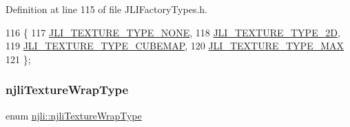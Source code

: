 Definition at line 115 of file J\+L\+I\+Factory\+Types.\+h.


\begin{DoxyCode}
116   \{
117     \mbox{\hyperlink{namespacenjli_a90fea397e2267cd1b01c163319db48fbab5e739e2d62a00c06335ad4eb96bd7d7}{JLI\_TEXTURE\_TYPE\_NONE}},
118     \mbox{\hyperlink{namespacenjli_a90fea397e2267cd1b01c163319db48fba1fc3a248edc8a6093efb9ed946de3915}{JLI\_TEXTURE\_TYPE\_2D}},
119     \mbox{\hyperlink{namespacenjli_a90fea397e2267cd1b01c163319db48fba244d1d6419307868899f3607854a6a00}{JLI\_TEXTURE\_TYPE\_CUBEMAP}},
120     \mbox{\hyperlink{namespacenjli_a90fea397e2267cd1b01c163319db48fbacab660ca2ecd47a3ad29fb4b2285aa7e}{JLI\_TEXTURE\_TYPE\_MAX}}
121   \};
\end{DoxyCode}
\mbox{\label{namespacenjli_a6e9496d4850ec7151f04a220e1979b62}} 
\subsubsection{\texorpdfstring{njli\+Texture\+Wrap\+Type}{njliTextureWrapType}}
{\footnotesize\ttfamily enum \mbox{\hyperlink{namespacenjli_a6e9496d4850ec7151f04a220e1979b62}{njli\+::njli\+Texture\+Wrap\+Type}}}

